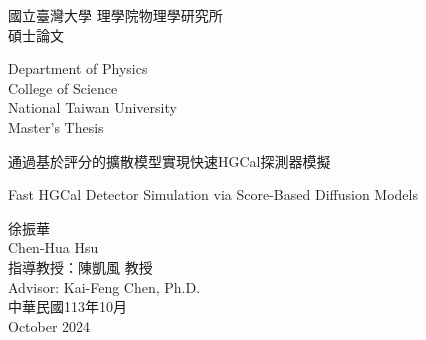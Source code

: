 
\thispagestyle{empty}

\begin{titlepage}

\parskip=8pt					%
\linespread{1.5}

\begin{center}

\thispagestyle{empty}

\begin{center}
\begin{CJK}{UTF8}{bkai}
 \vspace {4.0cm}
\LARGE \noindent   國立臺灣大學 理學院物理學研究所 \\
        \vspace {0.0cm}
        碩士論文\\
            \end{CJK}
            \vspace {0.2cm}
{
    \noindent
        \large Department of Physics\\
        \vspace {0.0cm}
    \large College of Science\\
        \vspace {0.0cm}
    \large National Taiwan University\\
        \vspace {0.0cm}
    \large Master's Thesis\\
}

\vspace {2.0cm}
\setlength{\baselineskip}{32pt}
\begin{CJK}{UTF8}{bkai}
\LARGE  \noindent
通過基於評分的擴散模型實現快速HGCal探測器模擬
\end{CJK}

\vspace {0.5cm}
\setlength{\baselineskip}{24pt}
{\LARGE \noindent Fast HGCal Detector Simulation via Score-Based Diffusion Models
}\\

\vspace {5.0cm}

\begin{CJK}{UTF8}{bkai}
\Large \noindent   徐振華\\
\vspace {0.0cm}
\Large Chen-Hua Hsu\\
\vspace {0.2cm}
\Large 指導教授：陳凱風 教授\\
\vspace {0.0cm}
\Large Advisor: Kai-Feng Chen, Ph.D.\\

\vspace {0.4cm}
\Large \noindent   中華民國113年10月\\
\Large \noindent   October 2024\\
\end{CJK}

\end{center}

\end{center}

\end{titlepage}

